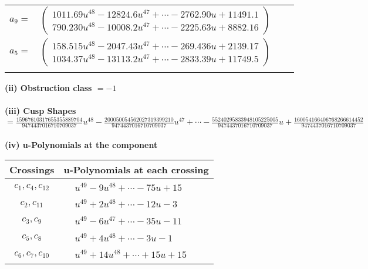 \documentclass[1p]{elsarticle_modified}
\theoremstyle{definition}
\begin{document}
\begin{tabular}{m{7pt} m{180pt} m{7pt} m{180pt} }
\flushright $a_{9}=$&$\begin{pmatrix}1011.69 u^{48}-12824.6 u^{47}+\cdots-2762.90 u+11491.1\\790.230 u^{48}-10008.2 u^{47}+\cdots-2225.63 u+8882.16\end{pmatrix}$ \\
\flushright $a_{5}=$&$\begin{pmatrix}158.515 u^{48}-2047.43 u^{47}+\cdots-269.436 u+2139.17\\1034.37 u^{48}-13113.2 u^{47}+\cdots-2833.39 u+11749.5\end{pmatrix}$\\&\end{tabular}
\flushleft \textbf{(ii) Obstruction class $= -1$}\\~\\
\flushleft \textbf{(iii) Cusp Shapes $= \frac{15967610317655355889704}{9474437016710709037} u^{48}-\frac{200050054562027319399210}{9474437016710709037} u^{47}+\cdots-\frac{55240295833948105225005}{9474437016710709037} u+\frac{160054166406768266614452}{9474437016710709037}$}\\~\\
\newpage\renewcommand{\arraystretch}{1}
\flushleft \textbf{(iv) u-Polynomials at the component}\newline \\
\begin{tabular}{m{50pt}|m{274pt}}
Crossings & \hspace{64pt}u-Polynomials at each crossing \\
\hline $$\begin{aligned}c_{1},c_{4},c_{12}\end{aligned}$$&$\begin{aligned}
&u^{49}-9 u^{48}+\cdots-75 u+15
\end{aligned}$\\
\hline $$\begin{aligned}c_{2},c_{11}\end{aligned}$$&$\begin{aligned}
&u^{49}+2 u^{48}+\cdots-12 u-3
\end{aligned}$\\
\hline $$\begin{aligned}c_{3},c_{9}\end{aligned}$$&$\begin{aligned}
&u^{49}-6 u^{47}+\cdots-35 u-11
\end{aligned}$\\
\hline $$\begin{aligned}c_{5},c_{8}\end{aligned}$$&$\begin{aligned}
&u^{49}+4 u^{48}+\cdots-3 u-1
\end{aligned}$\\
\hline $$\begin{aligned}c_{6},c_{7},c_{10}\end{aligned}$$&$\begin{aligned}
&u^{49}+14 u^{48}+\cdots+15 u+15
\end{aligned}$\\
\hline
\end{tabular}\\~\\
\end{document}
